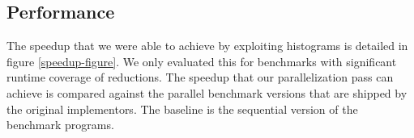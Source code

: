 \subsection{Performance}


The speedup that we were able to achieve by exploiting histograms is detailed in
figure \ref{speedup-figure}.  We only evaluated this for benchmarks
with significant runtime coverage of reductions.  The speedup that our
parallelization pass can achieve is compared against the parallel
benchmark versions that are shipped by the original implementors.  The
baseline is the sequential version of the benchmark programs.



